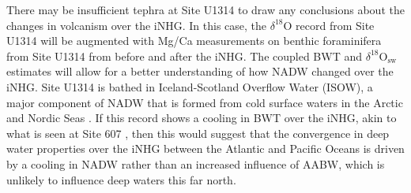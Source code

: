 There may be insufficient tephra at Site U1314 to draw any conclusions about the changes in volcanism over the iNHG. In this case, the $\delta^{18}\text{O}$ record from Site U1314 will be augmented with Mg/Ca measurements on benthic foraminifera from Site U1314 from before and after the iNHG. The coupled BWT and $\delta^{18}\text{O}_\text{sw}$ estimates will allow for a better understanding of how NADW changed over the iNHG. Site U1314 is bathed in Iceland-Scotland Overflow Water (ISOW), a major component of NADW that is formed from cold surface waters in the Arctic and Nordic Seas \citep{xuVariabilityIcelandScotland2018}. If this record shows a cooling in BWT over the iNHG, akin to what is seen at Site 607 \citep{sosdianDeepSeaTemperatureIce2009}, then this would suggest that the convergence in deep water properties over the iNHG between the Atlantic and Pacific Oceans is driven by a cooling in NADW \citep{woodardAntarcticRoleNorthern2014} rather than an increased influence of AABW, which is unlikely to influence deep waters this far north. 







